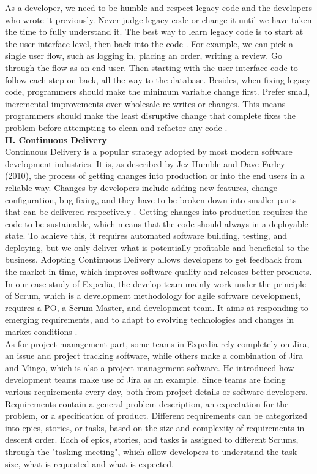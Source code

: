 \documentclass[11pt]{article}
\begin{document}
As a developer, we need to be humble and respect legacy code and the developers who wrote it previously. Never judge legacy code or change it until we have taken the time to fully understand it. The best way to learn legacy code is to start at the user interface level, then back into the code \cite{no4}. For example, we can pick a single user flow, such as logging in, placing an order, writing a review. Go through the flow as an end user. Then starting with the user interface code to follow each step on back, all the way to the database. Besides, when fixing legacy code, programmers should make the minimum variable change \cite{no4} first. Prefer small, incremental improvements over wholesale re-writes or changes. This means programmers should make the least disruptive change that complete fixes the problem before attempting to clean and refactor any code \cite{no4}. \\[10px]
{\bf II. Continuous Delivery}\\[10px]
Continuous Delivery is a popular strategy adopted by most modern software development industries. It is, as described by Jez Humble and Dave Farley (2010), the process of getting changes into production or into the end users in a reliable way. Changes by developers include adding new features, change configuration, bug fixing, and they have to be broken down into smaller parts that can be delivered respectively \cite{no5}. Getting changes into production requires the code to be sustainable, which means that the code should always in a deployable state. To achieve this, it requires automated software building, testing, and deploying, but we only deliver what is potentially profitable and beneficial to the business. Adopting Continuous Delivery allows developers to get feedback from the market in time, which improves software quality and releases better products. \\[10px]
In our case study of Expedia, the develop team mainly work under the principle of Scrum, which is a development methodology for agile software development, requires a PO, a Scrum Master, and development team. It aims at responding to emerging requirements, and to adapt to evolving technologies and changes in market conditions \cite{no6}. \\[10px]
As for project management part, some teams in Expedia rely completely on Jira, an issue and project tracking software, while others make a combination of Jira and Mingo, which is also a project management software. He introduced how development teams make use of Jira as an example. Since teams are facing various requirements every day, both from project details or software developers. Requirements contain a general problem description, an expectation for the problem, or a specification of product. Different requirements can be categorized into epics, stories, or tasks, based on the size and complexity of requirements in descent order. Each of epics, stories, and tasks is assigned to different Scrums, through the "tasking meeting", which allow developers to understand the task size, what is requested and what is expected. \\[10px]
\end{document}
